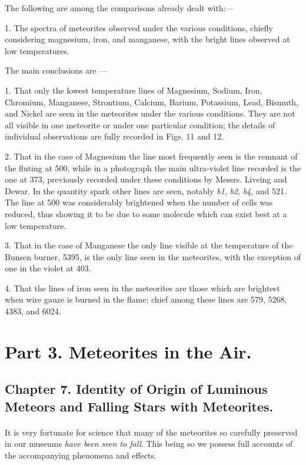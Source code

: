 \documentclass[a4paper, 12pt, oneside, polutonikogreek, english]{article}
\begin{document}
The following are among the comparisons already dealt with:---

1. The spectra of meteorites observed under the various conditions, chiefly considering magnesium, iron, and manganese, with the bright lines observed at low temperatures.

The main conclusions are ---

1. That only the lowest temperature lines of Magnesium, Sodium, Iron, Chromium, Manganese, Strontium, Calcium, Barium, Potassium, Lead, Bismuth, and Nickel are seen in the meteorites under the various conditions. They are not all visible in one meteorite or under one particular condition; the details of individual observations are fully recorded in Figs. 11 and 12.

2. That in the case of Magnesium the line most frequently seen is the remnant of the fluting at 500, while in a photograph the main ultra-violet line recorded is the one at 373, previously recorded under these conditions by Messrs. Liveing and Dewar. In the quantity spark other lines are seen, notably \emph{b1}, \emph{b2}, \emph{b4}, and 521. The line at 500 was considerably brightened when the number of cells was reduced, thus showing it to be due to some molecule which can exist best at a low temperature.

3. That in the case of Manganese the only line visible at the temperature of the Bunsen burner, 5395, is the only line seen in the meteorites, with the exception of one in the violet at 403.

4. That the lines of iron seen in the meteorites are those which are brightest when wire gauze is burned in the flame; chief among these lines are 579, 5268, 4383, and 6024.
\clearpage
\section{Part 3. Meteorites in the Air.}
\subsection{Chapter 7. Identity of Origin of Luminous Meteors and Falling Stars with Meteorites.}
\paragraph{}
It is very fortunate for science that many of the meteorites so carefully preserved in our museums \emph{have been seen to fall}. This being so we possess full accounts of the accompanying phenomena and effects.
\end{document}
